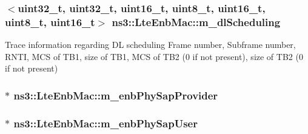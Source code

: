 \subsubsection[{\texorpdfstring{m\+\_\+dl\+Scheduling}{m_dlScheduling}}]{$<$uint32\+\_\+t, uint32\+\_\+t, uint16\+\_\+t, uint8\+\_\+t, uint16\+\_\+t, uint8\+\_\+t, uint16\+\_\+t$>$ ns3\+::\+Lte\+Enb\+Mac\+::m\+\_\+dl\+Scheduling\hspace{0.3cm}{\ttfamily [private]}}\hypertarget{classns3_1_1LteEnbMac_a76fc41748a5422281aa4f3d2739512b5}{}\label{classns3_1_1LteEnbMac_a76fc41748a5422281aa4f3d2739512b5}
Trace information regarding DL scheduling Frame number, Subframe number, R\+N\+TI, M\+CS of T\+B1, size of T\+B1, M\+CS of T\+B2 (0 if not present), size of T\+B2 (0 if not present) 
\subsubsection[{\texorpdfstring{m\+\_\+enb\+Phy\+Sap\+Provider}{m_enbPhySapProvider}}]{$\ast$ ns3\+::\+Lte\+Enb\+Mac\+::m\+\_\+enb\+Phy\+Sap\+Provider\hspace{0.3cm}{\ttfamily [private]}}\hypertarget{classns3_1_1LteEnbMac_a1f4686da5350f6b70b6b966322c109fd}{}\label{classns3_1_1LteEnbMac_a1f4686da5350f6b70b6b966322c109fd}
\subsubsection[{\texorpdfstring{m\+\_\+enb\+Phy\+Sap\+User}{m_enbPhySapUser}}]{$\ast$ ns3\+::\+Lte\+Enb\+Mac\+::m\+\_\+enb\+Phy\+Sap\+User\hspace{0.3cm}{\ttfamily [private]}}\hypertarget{classns3_1_1LteEnbMac_a5ebdfe8020efdb808653315b6d3c26ac}{}\label{classns3_1_1LteEnbMac_a5ebdfe8020efdb808653315b6d3c26ac}
